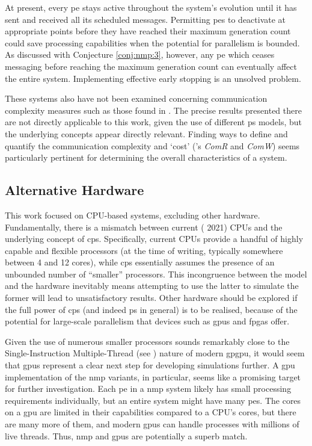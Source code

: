 At present, every \gls{pe} stays active throughout the system's evolution until it has sent and received all its scheduled messages.  Permitting \glspl{pe} to deactivate at appropriate points before they have reached their maximum generation count could save processing capabilities when the potential for parallelism is bounded.  As discussed with Conjecture \ref{conj:nmp:3}, however, any \gls{pe} which ceases messaging before reaching the maximum generation count can eventually affect the entire system.  Implementing effective early stopping is an unsolved problem.

These systems also have not been examined concerning communication complexity measures such as those found in \cite{Juayong2020}.  The precise results presented there are not directly applicable to this work, given the use of different \gls{ps} models, but the underlying concepts appear directly relevant.  Finding ways to define and quantify the communication complexity and `cost' (\cite{Juayong2020}'s \emph{ComR} and \emph{ComW}) seems particularly pertinent for determining the overall characteristics of a system.


\subsection{Alternative Hardware}
This work focused on CPU-based systems, excluding other hardware.  Fundamentally, there is a mismatch between current (\circa{} 2021) CPUs and the underlying concept of \gls{cps}.  Specifically, current CPUs provide a handful of highly capable and flexible processors (at the time of writing, typically somewhere between 4 and 12 cores), while \gls{cps} essentially assumes the presence of an unbounded number of ``smaller'' processors.  This incongruence between the model and the hardware inevitably means attempting to use the latter to simulate the former will lead to unsatisfactory results.  Other hardware should be explored if the full power of \gls{cps} (and indeed \gls{ps} in general) is to be realised, because of the potential for large-scale parallelism that devices such as \glspl{gpu} and \glspl{fpga} offer.

Given the use of numerous smaller processors sounds remarkably close to the Single-Instruction Multiple-Thread (see \cite[Ch. 4.4.1]{Hennessy2012}) nature of modern \gls{gpgpu}, it would seem that \glspl{gpu} represent a clear next step for developing simulations further.  A \gls{gpu} implementation of the \gls{nmp} variants, in particular, seems like a promising target for further investigation.  Each \gls{pe} in a \gls{nmp} system likely has small processing requirements individually, but an entire system might have many \glspl{pe}.  The cores on a \gls{gpu} are limited in their capabilities compared to a CPU's cores, but there are many more of them, and modern \glspl{gpu} can handle processes with millions of live threads.  Thus, \gls{nmp} and \glspl{gpu} are potentially a superb match.

